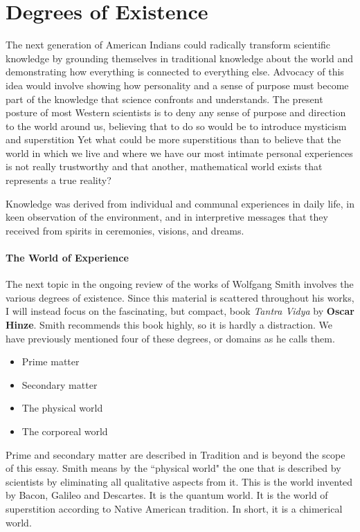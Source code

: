 \section{Degrees of Existence}

\begin{quotex}
The next generation of American Indians could radically transform scientific knowledge by grounding themselves in traditional knowledge about the world and demonstrating how everything is connected to everything else. Advocacy of this idea would involve showing how personality and a sense of purpose must become part of the knowledge that science confronts and understands. The present posture of most Western scientists is to deny any sense of purpose and direction to the world around us, believing that to do so would be to introduce mysticism and superstition Yet what could be more superstitious than to believe that the world in which we live and where we have our most intimate personal experiences is not really trustworthy and that another, mathematical world exists that represents a true reality?

Knowledge was derived from individual and communal experiences in daily life, in keen observation of the environment, and in interpretive messages that they received from spirits in ceremonies, visions, and dreams. 

\end{quotex}
\paragraph{The World of Experience}
The next topic in the ongoing review of the works of Wolfgang Smith involves the various degrees of existence. Since this material is scattered throughout his works, I will instead focus on the fascinating, but compact, book \emph{Tantra Vidya} by \textbf{Oscar Hinze}. Smith recommends this book highly, so it is hardly a distraction. We have previously mentioned four of these degrees, or domains as he calls them.

\begin{itemize}
\item Prime matter 
\item Secondary matter 
\item The physical world 
\item The corporeal world 
\end{itemize}
Prime and secondary matter are described in Tradition and is beyond the scope of this essay. Smith means by the ``physical world" the one that is described by scientists by eliminating all qualitative aspects from it. This is the world invented by Bacon, Galileo and Descartes. It is the quantum world. It is the world of superstition according to Native American tradition. In short, it is a chimerical world.

